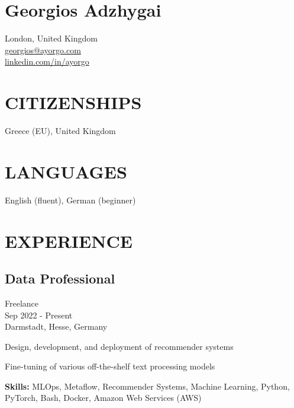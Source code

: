 \documentclass[a4paper,10pt]{article}
\begin{document}
\section*{\Large Georgios Adzhygai}
London, United Kingdom \\
\href{mailto:georgios@ayorgo.com}{georgios@ayorgo.com} \\
\href{https://www.linkedin.com/in/ayorgo}{linkedin.com/in/ayorgo}

\section*{CITIZENSHIPS}
Greece (EU), United Kingdom

\section*{LANGUAGES}
English (fluent), German (beginner)

\section*{EXPERIENCE}

\subsection*{Data Professional}
Freelance \\
Sep 2022 - Present \\
Darmstadt, Hesse, Germany
\begin{bulletlist}
    \item Design, development, and deployment of recommender systems
    \item Fine-tuning of various off-the-shelf text processing models
\end{bulletlist}
\textbf{Skills:} MLOps, Metaflow, Recommender Systems, Machine Learning, Python, PyTorch, Bash, Docker, Amazon
Web Services (AWS)
\end{document}
